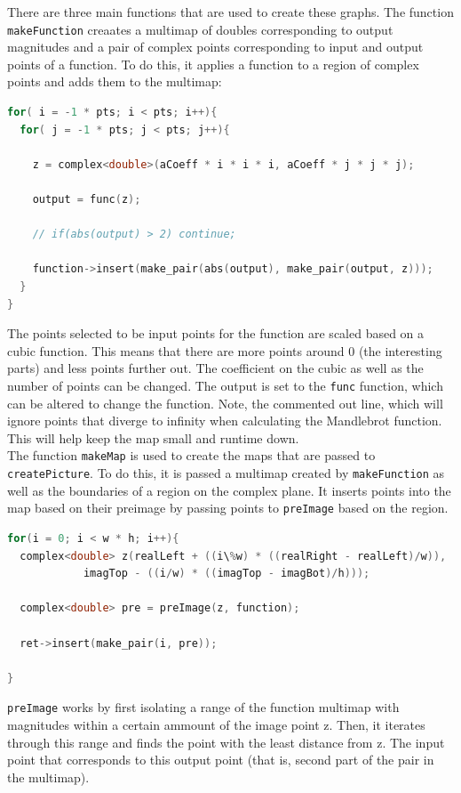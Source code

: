 \documentclass[letterpaper,12pt]{article}
\begin{document}
There are three main functions that are used to create these graphs. The function \verb|makeFunction| creaates a multimap of doubles corresponding to output magnitudes and a pair of complex points corresponding to input and output points of a function. To do this, it applies a function to a region of complex points and adds them to the multimap:
\begin{lstlisting}[language=c++]
for( i = -1 * pts; i < pts; i++){
  for( j = -1 * pts; j < pts; j++){

    z = complex<double>(aCoeff * i * i * i, aCoeff * j * j * j);

    output = func(z);

    // if(abs(output) > 2) continue;

    function->insert(make_pair(abs(output), make_pair(output, z)));
  }
}
\end{lstlisting}
The points selected to be input points for the function are scaled based on a cubic function.
This means that there are more points around 0 (the interesting parts) and less points further out.
The coefficient on the cubic as well as the number of points can be changed.
The output is set to the \verb|func| function, which can be altered to change the function. Note, the commented out line, which
will ignore points that diverge to infinity when calculating the Mandlebrot function. This will help keep the map small and runtime down. \\

The function \verb|makeMap| is used to create the maps that are passed to \verb|createPicture|.
To do this, it is passed a multimap created by \verb|makeFunction| as well as the boundaries of a region on the complex plane.
It inserts points into the map based on their preimage by passing points to \verb|preImage| based on the region.
\begin{lstlisting}[language=c++]
for(i = 0; i < w * h; i++){
  complex<double> z(realLeft + ((i\%w) * ((realRight - realLeft)/w)),
			imagTop - ((i/w) * ((imagTop - imagBot)/h)));

  complex<double> pre = preImage(z, function);

  ret->insert(make_pair(i, pre));

}
\end{lstlisting}
\verb|preImage| works by first isolating a range of the function multimap with magnitudes within a certain ammount of the image point z.
Then, it iterates through this range and finds the point with the least distance from z.
The input point that corresponds to this output point (that is, second part of the pair in the multimap).
\end{document}
